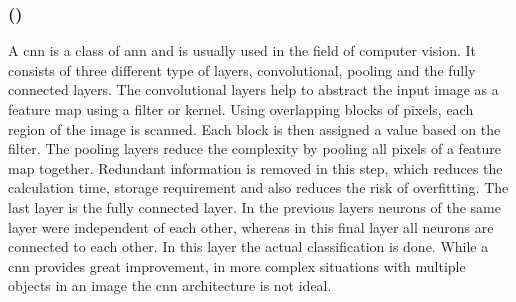 \subsubsection{ ()}
A \gls{cnn} is a class of \gls{ann} and is usually used in the field of computer vision.
It consists of three different type of layers, convolutional, pooling and the fully connected layers.
The convolutional layers help to abstract the input image as a feature map using a filter or kernel.
Using overlapping blocks of pixels, each region of the image is scanned.
Each block is then assigned a value based on the filter.
The pooling layers reduce the complexity by pooling all pixels of a feature map together.
Redundant information is removed in this step, which reduces the calculation time, storage requirement and also reduces the risk of overfitting.
The last layer is the fully connected layer.
In the previous layers neurons of the same layer were independent of each other, whereas in this final layer all neurons are connected to each other.
In this layer the actual classification is done.
While a \gls{cnn} provides great improvement, in more complex situations with multiple objects in an image the \gls{cnn} architecture is not ideal.

